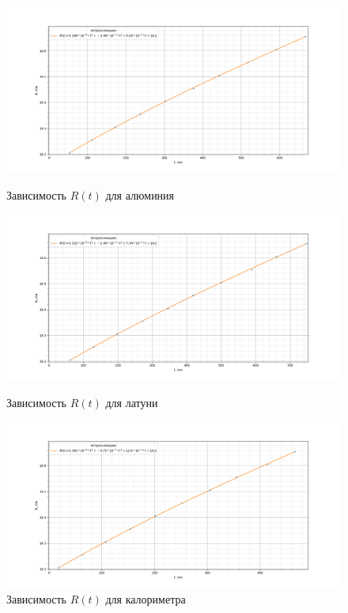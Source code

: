 \documentclass[a4paper, 12pt]{article}%
\begin{document}
	\begin{figure}[H]
		\begin{center}
			\begin{minipage}[h]{0.48\linewidth}
				\includegraphics[width=1\linewidth]{graph_al}
				\caption{Зависимость $R(t)$ для алюминия} %
			\end{minipage}
			\hfill
			\begin{minipage}[h]{0.48\linewidth}
				\includegraphics[width=1\linewidth]{graph_lat}
				\caption{Зависимость $R(t)$ для латуни}
				

			\end{minipage}

		\end{center}
		\begin{center}
			\begin{minipage}[h]{0.98\linewidth}
				\includegraphics[width=1\linewidth]{graph_empty}
				\caption{Зависимость $R(t)$ для калориметра}
			\end{minipage}
		\end{center}
	\end{figure}
\end{document}
